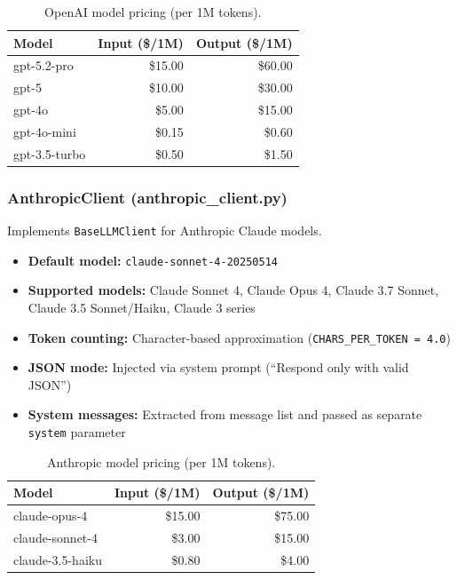 \documentclass[11pt,a4paper]{article}
\begin{document}
\begin{table}[H]
\centering\small
\begin{tabular}{lrr}
\toprule
\textbf{Model} & \textbf{Input (\$/1M)} & \textbf{Output (\$/1M)} \\
\midrule
gpt-5.2-pro & \$15.00 & \$60.00 \\
gpt-5 & \$10.00 & \$30.00 \\
gpt-4o & \$5.00 & \$15.00 \\
gpt-4o-mini & \$0.15 & \$0.60 \\
gpt-3.5-turbo & \$0.50 & \$1.50 \\
\bottomrule
\end{tabular}
\caption{OpenAI model pricing (per 1M tokens).}
\end{table}

\subsubsection{AnthropicClient (anthropic\_client.py)}

Implements \texttt{BaseLLMClient} for Anthropic Claude models.

\begin{itemize}[nosep]
  \item \textbf{Default model:} \texttt{claude-sonnet-4-20250514}
  \item \textbf{Supported models:} Claude Sonnet 4, Claude Opus 4, Claude 3.7 Sonnet, Claude 3.5 Sonnet/Haiku, Claude 3 series
  \item \textbf{Token counting:} Character-based approximation (\texttt{CHARS\_PER\_TOKEN = 4.0})
  \item \textbf{JSON mode:} Injected via system prompt (``Respond only with valid JSON'')
  \item \textbf{System messages:} Extracted from message list and passed as separate \texttt{system} parameter
\end{itemize}

\begin{table}[H]
\centering\small
\begin{tabular}{lrr}
\toprule
\textbf{Model} & \textbf{Input (\$/1M)} & \textbf{Output (\$/1M)} \\
\midrule
claude-opus-4 & \$15.00 & \$75.00 \\
claude-sonnet-4 & \$3.00 & \$15.00 \\
claude-3.5-haiku & \$0.80 & \$4.00 \\
\bottomrule
\end{tabular}
\caption{Anthropic model pricing (per 1M tokens).}
\end{table}
\end{document}
